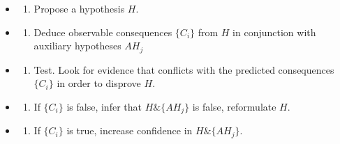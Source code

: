 \documentclass[
  12pt,
]{book}
\providecommand{\tightlist}{%
  \setlength{\itemsep}{0pt}\setlength{\parskip}{0pt}}
\begin{document}
\begin{itemize}
\tightlist
\item
  \begin{enumerate}
  \def\labelenumi{\arabic{enumi}.}
  \tightlist
  \item
    Propose a hypothesis \(H\).
  \end{enumerate}
\item
  \begin{enumerate}
  \def\labelenumi{\arabic{enumi}.}
  \setcounter{enumi}{1}
  \tightlist
  \item
    Deduce observable consequences \(\{C_i\}\) from \(H\) in conjunction with auxiliary hypotheses \({AH_j}\)
  \end{enumerate}
\item
  \begin{enumerate}
  \def\labelenumi{\arabic{enumi}.}
  \setcounter{enumi}{2}
  \tightlist
  \item
    Test. Look for evidence that conflicts with the predicted consequences \(\{C_i\}\) in order to disprove \(H\).
  \end{enumerate}
\item
  \begin{enumerate}
  \def\labelenumi{\arabic{enumi}.}
  \setcounter{enumi}{3}
  \tightlist
  \item
    If \(\{C_i\}\) is false, infer that \(H \& \{AH_j\}\) is false, reformulate \(H\).
  \end{enumerate}
\item
  \begin{enumerate}
  \def\labelenumi{\arabic{enumi}.}
  \setcounter{enumi}{4}
  \tightlist
  \item
    If \(\{C_i\}\) is true, increase confidence in \(H \& \{AH_j\}\).
  \end{enumerate}
\end{itemize}
\end{document}
